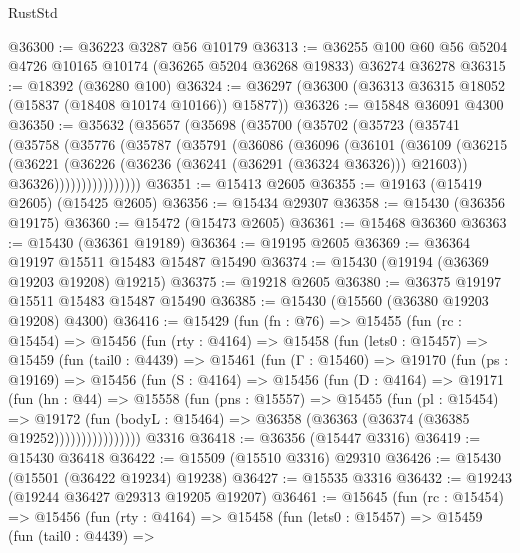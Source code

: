 \begin{lexlean}{RustStd}
\begin{coremodule}
@36300 := @36223 @3287 @56 @10179
@36313 := @36255 @100 @60 @56 @5204 @4726 @10165 @10174 (@36265 @5204 @36268 @19833) @36274 @36278
@36315 := @18392 (@36280 @100)
@36324 := @36297 (@36300 (@36313 @36315 @18052 (@15837 (@18408 @10174 @10166)) @15877))
@36326 := @15848 @36091 @4300
@36350 := @35632
    (@35657
      (@35698
        (@35700
          (@35702
            (@35723
              (@35741
                (@35758
                  (@35776
                    (@35787
                      (@35791
                        (@36086
                          (@36096
                            (@36101
                              (@36109
                                (@36215
                                  (@36221
                                    (@36226 (@36236 (@36241 (@36291 (@36324 @36326))) @21603))
                                    @36326))))))))))))))))
@36351 := @15413 @2605
@36355 := @19163 (@15419 @2605) (@15425 @2605)
@36356 := @15434 @29307
@36358 := @15430 (@36356 @19175)
@36360 := @15472 (@15473 @2605)
@36361 := @15468 @36360
@36363 := @15430 (@36361 @19189)
@36364 := @19195 @2605
@36369 := @36364 @19197 @15511 @15483 @15487 @15490
@36374 := @15430 (@19194 (@36369 @19203 @19208) @19215)
@36375 := @19218 @2605
@36380 := @36375 @19197 @15511 @15483 @15487 @15490
@36385 := @15430 (@15560 (@36380 @19203 @19208) @4300)
@36416 := @15429
    (fun (fn : @76) =>
    @15455
      (fun (rc : @15454) =>
      @15456
        (fun (rty : @4164) =>
        @15458
          (fun (lets0 : @15457) =>
          @15459
            (fun (tail0 : @4439) =>
            @15461
              (fun (Γ : @15460) =>
              @19170
                (fun (ps : @19169) =>
                @15456
                  (fun (S : @4164) =>
                  @15456
                    (fun (D : @4164) =>
                    @19171
                      (fun (hn : @44) =>
                      @15558
                        (fun (pns : @15557) =>
                        @15455
                          (fun (pl : @15454) =>
                          @19172
                            (fun (bodyL : @15464) =>
                            @36358 (@36363 (@36374 (@36385 @19252))))))))))))))))
    @3316
@36418 := @36356 (@15447 @3316)
@36419 := @15430 @36418
@36422 := @15509 (@15510 @3316) @29310
@36426 := @15430 (@15501 (@36422 @19234) @19238)
@36427 := @15535 @3316
@36432 := @19243 (@19244 @36427 @29313 @19205 @19207)
@36461 := @15645
    (fun (rc : @15454) =>
    @15456
      (fun (rty : @4164) =>
      @15458
        (fun (lets0 : @15457) =>
        @15459
          (fun (tail0 : @4439) =>

\end{coremodule}
\end{lexlean}
